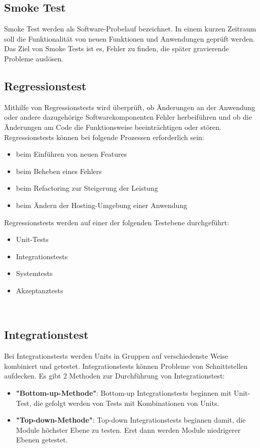 \subsection{Smoke Test}
Smoke Test werden als Software-Probelauf bezeichnet. 
In einem kurzen Zeitraum soll die Funktionalität von neuen Funktionen und Anwendungen geprüft werden. 
Das Ziel von Smoke Tests ist es, Fehler zu finden, die später gravierende Probleme auslösen.
~\cite{smoke_test}

\subsection{Regressionstest}
Mithilfe von Regressionstests wird überprüft, ob Änderungen an der Anwendung oder andere dazugehörige
Softwarekomponenten Fehler herbeiführen und ob die Änderungen am Code die Funktionsweise beeinträchtigen 
oder stören.
\newline
\newline
Regressionstests können bei folgende Prozessen erforderlich sein:
\begin{itemize}
  \item beim Einführen von neuen Features
  \item beim Beheben eines Fehlers
  \item beim Refactoring zur Steigerung der Leistung
  \item beim Ändern der Hosting-Umgebung einer Anwendung
\end{itemize}

Regressionstests werden auf einer der folgenden Testebene durchgeführt:
\begin{itemize}
  \item Unit-Tests
  \item Integrationstests
  \item Systemtests
  \item Akzeptanztests
\end{itemize}
~\cite{regressionstests}

\subsection{Integrationstest}
Bei Integrationstests werden Units in Gruppen auf verschiedenste Weise kombiniert und getestet. 
Integrationstests können Probleme von Schnittstellen aufdecken. 
\newline
\newline
Es gibt 2 Methoden zur Durchführung von Integrationstest:
\begin{itemize}
  \item \textbf{"Bottom-up-Methode"}:
  Bottom-up Integrationstests beginnen mit Unit-Test, die gefolgt werden von Tests mit Kombinationen von Units.

  \item \textbf{"Top-down-Methode"}:
  Top-down Integrationstests beginnen damit, die Module höchster Ebene zu testen. Erst dann werden Module niedrigerer Ebenen getestet.

\end{itemize}
~\cite{integrationstests}

